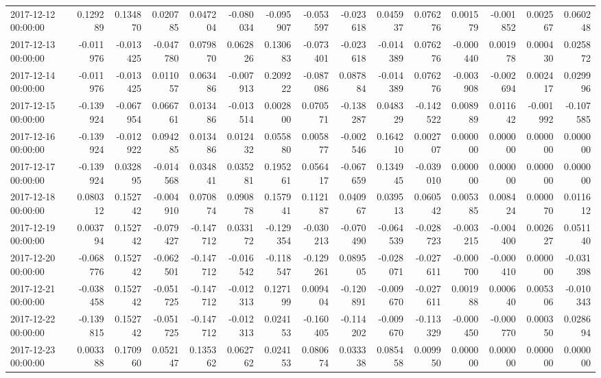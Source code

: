 \begin{tabular}{lrrrrrrrrrrrrrr}
2017-12-12 00:00:00 & 0.129289 & 0.134870 & 0.020785 & 0.047204 & -0.080034 & -0.095907 & -0.053597 & -0.023618 & 0.045937 & 0.076276 & 0.001579 & -0.001852 & 0.002567 & 0.060248 \\
2017-12-13 00:00:00 & -0.011976 & -0.013425 & -0.047780 & 0.079870 & 0.062826 & 0.130683 & -0.073401 & -0.023618 & -0.014389 & 0.076276 & -0.000440 & 0.001978 & 0.000430 & 0.025872 \\
2017-12-14 00:00:00 & -0.011976 & -0.013425 & 0.011057 & 0.063486 & -0.007913 & 0.209222 & -0.087086 & 0.087884 & -0.014389 & 0.076276 & -0.003908 & -0.002694 & 0.002417 & 0.029996 \\
2017-12-15 00:00:00 & -0.139924 & -0.067954 & 0.066761 & 0.013486 & -0.013514 & 0.002800 & 0.070571 & -0.138287 & 0.048329 & -0.142522 & 0.008989 & 0.011642 & -0.001992 & -0.107585 \\
2017-12-16 00:00:00 & -0.139924 & -0.012922 & 0.094285 & 0.013486 & 0.012432 & 0.055880 & 0.005877 & -0.002546 & 0.164210 & 0.002707 & 0.000000 & 0.000000 & 0.000000 & 0.000000 \\
2017-12-17 00:00:00 & -0.139924 & 0.032895 & -0.014568 & 0.034841 & 0.035281 & 0.195261 & 0.056417 & -0.067659 & 0.134945 & -0.039010 & 0.000000 & 0.000000 & 0.000000 & 0.000000 \\
2017-12-18 00:00:00 & 0.080312 & 0.152742 & -0.004910 & 0.070874 & 0.090878 & 0.157941 & 0.112187 & 0.040967 & 0.039513 & 0.060542 & 0.005385 & 0.008424 & 0.000070 & 0.011612 \\
2017-12-19 00:00:00 & 0.003794 & 0.152742 & -0.079427 & -0.147712 & 0.033172 & -0.129354 & -0.030213 & -0.070490 & -0.064539 & -0.028723 & -0.003215 & -0.004400 & 0.002627 & 0.051140 \\
2017-12-20 00:00:00 & -0.068776 & 0.152742 & -0.062501 & -0.147712 & -0.016542 & -0.118547 & -0.129261 & 0.089505 & -0.028071 & -0.027611 & -0.000700 & -0.000410 & 0.000000 & -0.031398 \\
2017-12-21 00:00:00 & -0.038458 & 0.152742 & -0.051725 & -0.147712 & -0.012313 & 0.127199 & 0.009404 & -0.120891 & -0.009670 & -0.027611 & 0.001988 & 0.000640 & 0.005306 & -0.010343 \\
2017-12-22 00:00:00 & -0.139815 & 0.152742 & -0.051725 & -0.147712 & -0.012313 & 0.024153 & -0.160405 & -0.114202 & -0.009670 & -0.113329 & -0.000450 & -0.000770 & 0.000350 & 0.028694 \\
2017-12-23 00:00:00 & 0.003388 & 0.170960 & 0.052147 & 0.135362 & 0.062762 & 0.024153 & 0.080674 & 0.033338 & 0.085458 & 0.009950 & 0.000000 & 0.000000 & 0.000000 & 0.000000 \\

\end{tabular}
